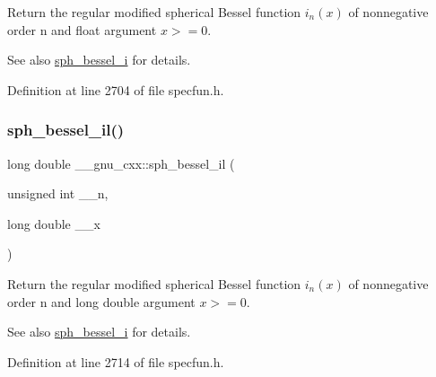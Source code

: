 Return the regular modified spherical Bessel function $ i_n(x) $ of nonnegative order n and {\ttfamily float} argument $ x >= 0 $.

\begin{DoxySeeAlso}{See also}
\hyperlink{group__gnu__math__spec__func_ga156b8154b27b7898c8b2abf4284f7323}{sph\+\_\+bessel\+\_\+i} for details. 
\end{DoxySeeAlso}


Definition at line 2704 of file specfun.\+h.

\mbox{\label{group__gnu__math__spec__func_gaf4392d9ed177913febdcbfccb947dbca}} 
\subsubsection{\texorpdfstring{sph\+\_\+bessel\+\_\+il()}{sph\_bessel\_il()}}
{\footnotesize\ttfamily long double \+\_\+\+\_\+gnu\+\_\+cxx\+::sph\+\_\+bessel\+\_\+il (\begin{DoxyParamCaption}\item[{unsigned int}]{\+\_\+\+\_\+n,  }\item[{long double}]{\+\_\+\+\_\+x }\end{DoxyParamCaption})\hspace{0.3cm}{\ttfamily [inline]}}

Return the regular modified spherical Bessel function $ i_n(x) $ of nonnegative order n and {\ttfamily long double} argument $ x >= 0 $.

\begin{DoxySeeAlso}{See also}
\hyperlink{group__gnu__math__spec__func_ga156b8154b27b7898c8b2abf4284f7323}{sph\+\_\+bessel\+\_\+i} for details. 
\end{DoxySeeAlso}


Definition at line 2714 of file specfun.\+h.

\mbox{\label{group__gnu__math__spec__func_ga288b28f2c6995d052a4f5f17293cbf1a}} 
